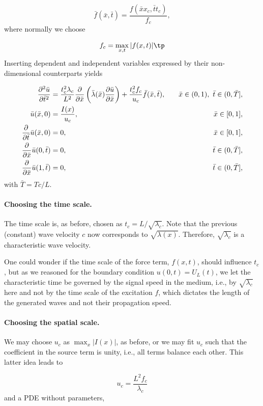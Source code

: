 \documentclass[graybox,envcountchap,sectrefs,final]{svmonodo}
\begin{document}
\[ \bar f(\bar x,\bar t) = \frac{f(\bar x x_c, \bar t t_c)}{f_c},\]
where normally we choose

\[ f_c=\max_{x,t}|f(x,t)|\tp\]
Inserting dependent and independent variables expressed by their
non-dimensional counterparts yields

\begin{align*}
\frac{\partial^2 \bar u}{\partial \bar t^2} &=
\frac{t_c^2\lambda_c}{L^2}\frac{\partial}{\partial \bar x}\left(
\bar\lambda(\bar x) {\partial\bar u\over\partial\bar x}\right)
+ \frac{t_c^2f_c}{u_c}\bar f(\bar x,\bar t),
\quad & \bar x\in (0,1),\ \bar t\in (0,\bar T],\\ 
\bar u(\bar x,0) &= \frac{I(x)}{u_c},
\quad &\bar x\in [0,1],\\ 
{\partial\over\partial \bar t}\bar u(\bar x,0) &= 0,
\quad & \bar x\in [0,1],\\ 
\frac{\partial}{\partial \bar x}\bar u(0,\bar t) & = 0,
\quad  &\bar t\in (0,\bar T],\\ 
\frac{\partial}{\partial \bar x}\bar u(1,\bar t) & = 0,
\quad  &\bar t\in (0,\bar T],
\end{align*}
with $\bar T = Tc/L$.


\paragraph{Choosing the time scale.}
The time scale is, as before, chosen as $t_c
=L/\sqrt{\lambda_c}$. Note that the previous (constant) wave velocity
$c$ now corresponds to $\sqrt{\lambda (x)}$.  Therefore,
$\sqrt{\lambda_c}$ is a characteristic wave velocity.

One could wonder if the time scale of the force term, $f(x,t)$,
should influence $t_c$, but as we reasoned for the boundary condition
$u(0,t)=U_L(t)$, we let the characteristic time be governed by the
signal speed in the medium, i.e., by $\sqrt{\lambda_c}$ here and not
by the time scale of the excitation $f$, which dictates the
length of the generated waves and not their propagation speed.

\paragraph{Choosing the spatial scale.}
We may choose $u_c$ as $\max_x |I(x)|$, as before,
or we may fit $u_c$ such that the coefficient in the source term
is unity, i.e., all terms balance each other.
This latter idea leads to

\[ u_c = \frac{L^2 f_c}{\lambda_c} \]
and a PDE without parameters,
\end{document}
